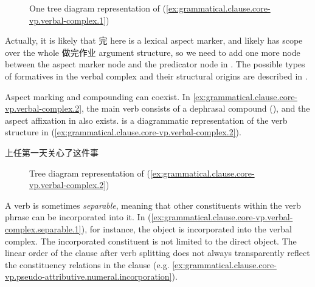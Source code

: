 \documentclass[UTF8, a4paper, oneside, scheme=plain, 12pt]{ctexrep}
\begin{document}
\begin{figure}[H]
    \centering
    {
        \small
        
    }
    \caption{One tree diagram representation of (\ref{ex:grammatical.clause.core-vp.verbal-complex.1})}
    \label{fig:grammatical.clause.core-vp.verbal-complex.1.1}
\end{figure}

Actually, it is likely that 完 here is a lexical aspect marker,
and likely has scope over the whole 做完作业 argument structure,
so we need to add one more node between the aspect marker node
and the predicator node in .
The possible types of formatives in the verbal complex
and their structural origins are described in .

Aspect marking and compounding can coexist.
In \ref{ex:grammatical.clause.core-vp.verbal-complex.2},
the main verb consists of a dephrasal compound (),
and the aspect affixation in  also exists.
is a diagrammatic representation of the verb structure in (\ref{ex:grammatical.clause.core-vp.verbal-complex.2}).

\begin{exe}
    \ex\label{ex:grammatical.clause.core-vp.verbal-complex.2} 上任第一天关心了这件事
\end{exe}

\begin{figure}[H]
    {
        \centering
        \small
        
    }
    \caption{Tree diagram representation of (\ref{ex:grammatical.clause.core-vp.verbal-complex.2})}
    \label{fig:grammatical.clause.core-vp.verbal-complex.2}
\end{figure}

A verb is sometimes \emph{separable},
meaning that other constituents within the verb phrase can be incorporated into it.
In (\ref{ex:grammatical.clause.core-vp.verbal-complex.separable.1}),
for instance, the object is incorporated into the verbal complex.
The incorporated constituent is not limited to the direct object.
The linear order of the clause after verb splitting
does not always transparently reflect the constituency relations in the clause
(e.g. \ref{ex:grammatical.clause.core-vp.pseudo-attributive.numeral.incorporation}).
\end{document}
